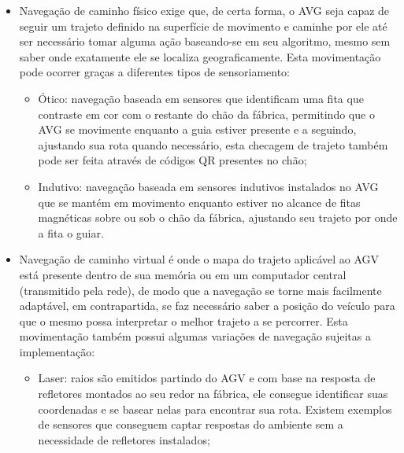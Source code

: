 \begin{itemize}

        \item Navegação de caminho físico exige que, de certa forma, o AVG seja
                capaz de seguir um trajeto definido na superfície de movimento
                e caminhe por ele até ser necessário tomar alguma ação
                baseando-se em seu algoritmo, mesmo sem saber onde exatamente
                ele se localiza geograficamente. Esta movimentação pode ocorrer
                graças a diferentes tipos de sensoriamento:

        \begin{itemize}
                \item Ótico: navegação baseada em sensores que identificam uma
                        fita que contraste em cor com o restante do chão da
                        fábrica, permitindo que o AVG se movimente enquanto a
                        guia estiver presente e a seguindo, ajustando sua rota
                        quando necessário, esta checagem de trajeto também pode
                        ser feita através de códigos QR presentes no chão;

                \item Indutivo: navegação baseada em sensores indutivos
                        instalados no AVG que se mantém em movimento enquanto
                        estiver no alcance de fitas magnéticas sobre ou sob o
                        chão da fábrica, ajustando seu trajeto por onde a fita
                        o guiar.

        \end{itemize}

        \item Navegação de caminho virtual é onde o mapa do trajeto aplicável
                ao AGV está presente dentro de sua memória ou em um computador
                central (transmitido pela rede), de modo que a navegação se
                torne mais facilmente adaptável, em contrapartida, se faz
                necessário saber a posição do veículo para que o mesmo possa
                interpretar o melhor trajeto a se percorrer. Esta movimentação
                também possui algumas variações de navegação sujeitas a
                implementação:

        \begin{itemize}

                \item Laser: raios são emitidos partindo do AGV e com base na
                        resposta de refletores montados ao seu redor na
                        fábrica, ele consegue identificar suas coordenadas e se
                        basear nelas para encontrar sua rota. Existem exemplos
                        de sensores que conseguem captar respostas do ambiente
                        sem a necessidade de refletores instalados;


\end{itemize}
\end{itemize}
